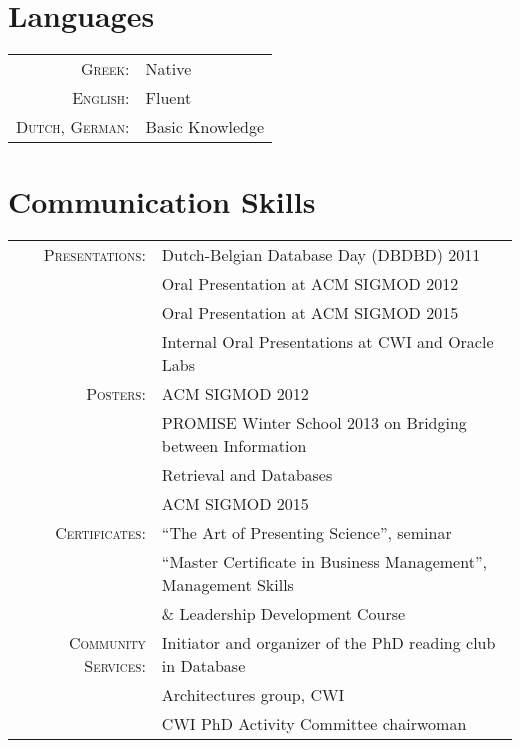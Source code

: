 \documentclass[a4paper,10pt]{article}
\begin{document}
\section{Languages}
\begin{tabular}{rl}
 \textsc{Greek:}&Native\\
\textsc{English:}&Fluent\\
\textsc{Dutch, German:}&Basic Knowledge\\
\end{tabular}

\section{Communication Skills}
\begin{tabular}{rl}
\textsc{Presentations}:& Dutch-Belgian Database Day (DBDBD) 2011\\
	& Oral Presentation at ACM SIGMOD 2012\\
        & Oral Presentation at ACM SIGMOD 2015\\
	& Internal Oral Presentations at CWI and Oracle Labs\\
\textsc{Posters}:& ACM SIGMOD 2012\\
        &\textsc{PROMISE} Winter School 2013 on Bridging between Information \\
        &Retrieval and Databases\\
	& ACM SIGMOD 2015\\
\textsc{Certificates}:& ``The Art of Presenting Science'', seminar\\
		      & ``Master Certificate in Business Management'', Management Skills\\ 
		      & \& Leadership Development Course\\
\textsc{Community Services}:& Initiator and organizer of the PhD reading club in Database\\ 
&Architectures group, CWI\\
 & CWI PhD Activity Committee chairwoman\\
\end{tabular}


\end{document}
